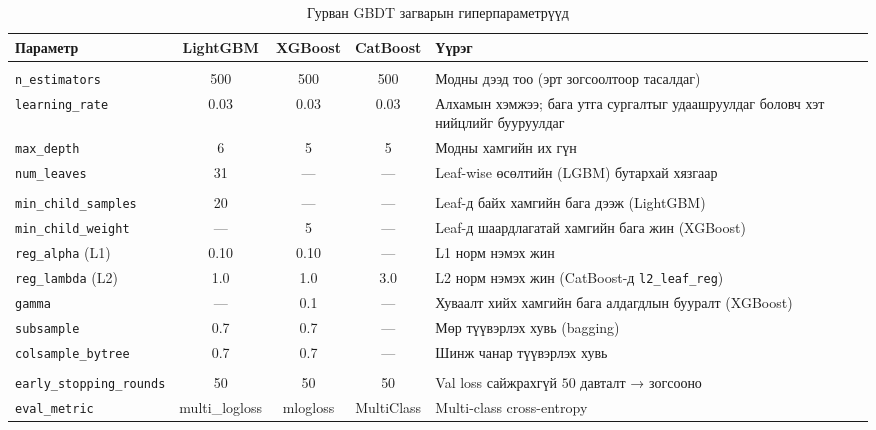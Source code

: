 \begin{table}[H]
\centering
\caption{Гурван GBDT загварын гиперпараметрүүд}
\label{tab:hyperparams_full}
\renewcommand{\arraystretch}{1.05}
\setlength{\tabcolsep}{3.5pt}
\footnotesize
\begin{tabularx}{\textwidth}{|>{\raggedright\arraybackslash}p{3.2cm}|c|c|c|>{\raggedright\arraybackslash}X|}
\hline
\textbf{Параметр} & \textbf{LightGBM} & \textbf{XGBoost} & \textbf{CatBoost} & \textbf{Үүрэг} \\ \hline
\multicolumn{5}{|l|}{\textit{Загварын ерөнхий бүтэц}} \\ \hline
\texttt{n\_estimators} & 500 & 500 & 500 & Модны дээд тоо (эрт зогсоолтоор тасалдаг) \\ \hline
\texttt{learning\_rate} & 0.03 & 0.03 & 0.03 & Алхамын хэмжээ; бага утга сургалтыг удаашруулдаг боловч хэт нийцлийг бууруулдаг \\ \hline
\texttt{max\_depth} & 6 & 5 & 5 & Модны хамгийн их гүн \\ \hline
\texttt{num\_leaves} & 31 & --- & --- & Leaf-wise өсөлтийн (LGBM) бутархай хязгаар \\ \hline
\multicolumn{5}{|l|}{\textit{Тогтмолжуулалт}} \\ \hline
\texttt{min\_child\_samples} & 20 & --- & --- & Leaf-д байх хамгийн бага дээж (LightGBM) \\ \hline
\texttt{min\_child\_weight} & --- & 5 & --- & Leaf-д шаардлагатай хамгийн бага жин (XGBoost) \\ \hline
\texttt{reg\_alpha} (L1) & 0.10 & 0.10 & --- & L1 норм нэмэх жин \\ \hline
\texttt{reg\_lambda} (L2) & 1.0 & 1.0 & 3.0 & L2 норм нэмэх жин (CatBoost-д \texttt{l2\_leaf\_reg}) \\ \hline
\texttt{gamma} & --- & 0.1 & --- & Хуваалт хийх хамгийн бага алдагдлын бууралт (XGBoost) \\ \hline
\texttt{subsample} & 0.7 & 0.7 & --- & Мөр түүвэрлэх хувь (bagging) \\ \hline
\texttt{colsample\_bytree} & 0.7 & 0.7 & --- & Шинж чанар түүвэрлэх хувь \\ \hline
\multicolumn{5}{|l|}{\textit{Сургалтын протокол}} \\ \hline
\texttt{early\_\allowbreak stopping\_\allowbreak rounds} & 50 & 50 & 50 & Val loss сайжрахгүй $50$ давталт → зогсооно \\ \hline
\texttt{eval\_metric} & multi\_logloss & mlogloss & MultiClass & Multi-class cross-entropy \\ \hline

\end{tabularx}
\end{table}
